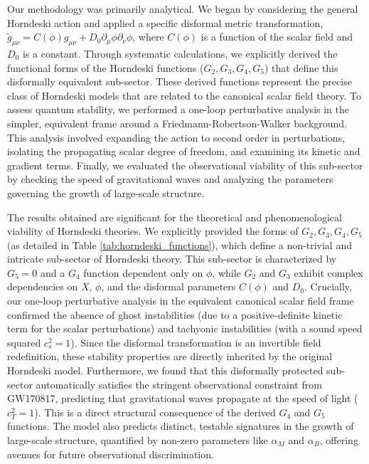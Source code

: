 \documentclass[twocolumn]{aastex631}
\begin{document}
Our methodology was primarily analytical. We began by considering the general Horndeski action and applied a specific disformal metric transformation, $\tilde{g}_{\mu\nu} = C(\phi) g_{\mu\nu} + D_0 \partial_\mu\phi \partial_\nu\phi$, where $C(\phi)$ is a function of the scalar field and $D_0$ is a constant. Through systematic calculations, we explicitly derived the functional forms of the Horndeski functions ($G_2, G_3, G_4, G_5$) that define this disformally equivalent sub-sector. These derived functions represent the precise class of Horndeski models that are related to the canonical scalar field theory. To assess quantum stability, we performed a one-loop perturbative analysis in the simpler, equivalent frame around a Friedmann-Robertson-Walker background. This analysis involved expanding the action to second order in perturbations, isolating the propagating scalar degree of freedom, and examining its kinetic and gradient terms. Finally, we evaluated the observational viability of this sub-sector by checking the speed of gravitational waves and analyzing the parameters governing the growth of large-scale structure.

The results obtained are significant for the theoretical and phenomenological viability of Horndeski theories. We explicitly provided the forms of $G_2, G_3, G_4, G_5$ (as detailed in Table \ref{tab:horndeski_functions}), which define a non-trivial and intricate sub-sector of Horndeski theory. This sub-sector is characterized by $G_5=0$ and a $G_4$ function dependent only on $\phi$, while $G_2$ and $G_3$ exhibit complex dependencies on $X$, $\phi$, and the disformal parameters $C(\phi)$ and $D_0$. Crucially, our one-loop perturbative analysis in the equivalent canonical scalar field frame confirmed the absence of ghost instabilities (due to a positive-definite kinetic term for the scalar perturbations) and tachyonic instabilities (with a sound speed squared $c_s^2=1$). Since the disformal transformation is an invertible field redefinition, these stability properties are directly inherited by the original Horndeski model. Furthermore, we found that this disformally protected sub-sector automatically satisfies the stringent observational constraint from GW170817, predicting that gravitational waves propagate at the speed of light ($c_T^2=1$). This is a direct structural consequence of the derived $G_4$ and $G_5$ functions. The model also predicts distinct, testable signatures in the growth of large-scale structure, quantified by non-zero parameters like $\alpha_M$ and $\alpha_B$, offering avenues for future observational discrimination.
\end{document}
